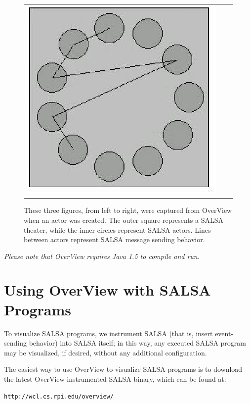 \begin{figure}
\begin{tabular}{lll}
\includegraphics[angle=0,scale=0.3]{heatavi3.eps} \\
\end{tabular}
\caption{These three figures, from left to right, were captured from OverView when an actor was created. 
The outer square represents a SALSA theater, while the inner circles 
represent SALSA actors. Lines between actors represent SALSA message sending behavior.}
\label{heatExample}
\end{figure}

\emph{Please note that OverView requires Java 1.5 to compile and run.}

\section{Using OverView with SALSA Programs}
To visualize SALSA programs, we instrument SALSA (that is, insert event-sending behavior) into SALSA itself; in this way, any executed SALSA program may be visualized, if desired, without any additional configuration.

The easiest way to use OverView to visualize SALSA programs is to download the latest OverView-instrumented SALSA binary, which can be found at:
\begin{description}
  \item {\tt http://wcl.cs.rpi.edu/overview/}
\end{description}

